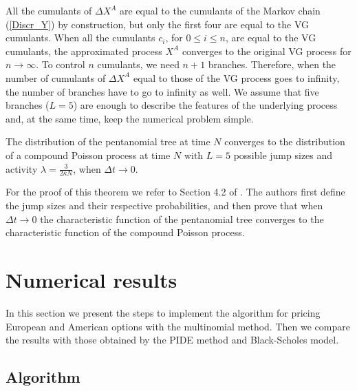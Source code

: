 \begin{Remark}
All the cumulants of $\Delta X^A$ are equal to the cumulants of the Markov chain (\ref{Discr_Y}) by construction, but only the first four are equal to the VG cumulants.
When all the cumulants $c_i$, for $0 \leq i \leq n$, are equal to the VG cumulants, the approximated process $X^A$ converges to
the original VG process for $n \to \infty$.
To control $n$ cumulants, we need $n+1$ branches. Therefore, when the number of cumulants of $\Delta X^A$ equal to those of the VG process goes to infinity, 
the number of branches have to go to infinity as well.
We assume that five branches ($L=5$) are enough to describe the features of the underlying process and, at the same time, keep the numerical
problem simple. 
\end{Remark}

\begin{Theorem}
The distribution of the pentanomial tree at time $N$ converges to the distribution of a compound Poisson process at time $N$ with $L=5$ possible jump sizes and activity $\lambda = \frac{3}{2 \bar \kappa N}$, when $\Delta t \to 0$.   
\end{Theorem}
For the proof of this theorem  
we refer to Section 4.2 of \cite{YaPr06}. The authors first define the jump sizes and their respective probabilities, and then
prove that when $\Delta t \to 0$ the characteristic function of the pentanomial tree converges to the 
characteristic function of the compound Poisson process.



\section{Numerical results} \label{sec4_ch3}

In this section we present the steps to implement the algorithm for pricing European and American options with the multinomial method.
Then we compare the results with those obtained by the PIDE method and Black-Scholes model.

\subsection{Algorithm}

